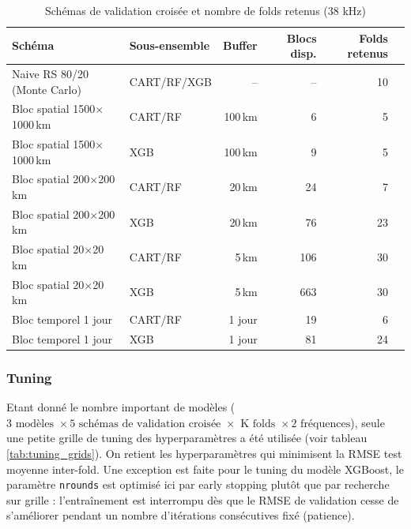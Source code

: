 \documentclass[11pt,a4paper,oneside]{report}
\begin{document}
	\begin{table}[htbp]
		\centering
		\caption{Schémas de validation croisée et nombre de folds retenus (38 kHz)}
		\label{tab:cv_schemes}
		\small
		\begin{tabularx}{\textwidth}{@{} l l r r r X @{}}
			\toprule
			Schéma & Sous-ensemble & Buffer & Blocs disp. & Folds retenus \\
			\midrule
			Naive RS 80/20 (Monte Carlo) & CART/RF/XGB & -- & -- & 10 \\
			\midrule
			Bloc spatial 1500$\times$1000\,km & CART/RF & 100\,km & 6   & 5 \\
			Bloc spatial 1500$\times$1000\,km & XGB     & 100\,km & 9   & 5 \\
			\midrule
			Bloc spatial 200$\times$200\,km & CART/RF & 20\,km & 24  & 7 \\
			Bloc spatial 200$\times$200\,km & XGB     & 20\,km & 76  & 23 \\
			\midrule
			Bloc spatial 20$\times$20\,km & CART/RF & 5\,km & 106 & 30 \\
			Bloc spatial 20$\times$20\,km & XGB     & 5\,km & 663 & 30 \\
			\midrule
			Bloc temporel 1 jour & CART/RF & 1 jour & 19  & 6   \\
			Bloc temporel 1 jour & XGB     & 1 jour & 81  & 24  \\
			\bottomrule
		\end{tabularx}
	\end{table}
	
	\subsubsection{Tuning}
	Etant donné le nombre important de modèles ($3 \text{ modèles } \times 5 \text{ schémas de validation croisée } \times \text{ K folds } \times 2 \text{ fréquences}$), seule une petite grille de tuning des hyperparamètres a été utilisée (voir tableau \ref{tab:tuning_grids}). On retient les hyperparamètres qui minimisent la RMSE test moyenne inter-fold. Une exception est faite pour le tuning du modèle XGBoost, le paramètre \texttt{nrounds} est optimisé ici par early stopping plutôt que par recherche sur grille : l'entraînement est interrompu dès que le RMSE de validation cesse de s'améliorer pendant un nombre d'itérations consécutives fixé (patience).
	
\end{document}
